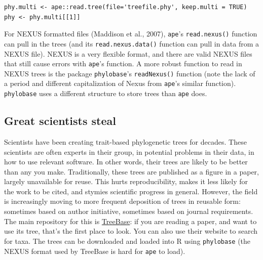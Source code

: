 \documentclass[]{book}
\theoremstyle{definition}
\theoremstyle{definition}
\theoremstyle{remark}
\begin{document}
\begin{verbatim}
phy.multi <- ape::read.tree(file='treefile.phy', keep.multi = TRUE)
phy <- phy.multi[[1]]
\end{verbatim}

For NEXUS formatted files (Maddison et al., 2007), \texttt{ape}'s
\texttt{read.nexus()} function can pull in the trees (and its
\texttt{read.nexus.data()} function can pull in data from a NEXUS file).
NEXUS is a very flexible format, and there are valid NEXUS files that
still cause errors with \texttt{ape}'s function. A more robust function
to read in NEXUS trees is the package \texttt{phylobase}'s
\texttt{readNexus()} function (note the lack of a period and different
capitalization of Nexus from \texttt{ape}'s similar function).
\texttt{phylobase} uses a different structure to store trees than
\texttt{ape} does.

\subsection{Great scientists steal}\label{great-scientists-steal}

Scientists have been creating trait-based phylogenetic trees for
decades. These scientists are often experts in their group, in potential
problems in their data, in how to use relevant software. In other words,
their trees are likely to be better than any you make. Traditionally,
these trees are published as a figure in a paper, largely unavailable
for reuse. This hurts reproducibility, makes it less likely for the work
to be cited, and stymies scientific progress in general. However, the
field is increasingly moving to more frequent deposition of trees in
reusable form: sometimes based on author initiative, sometimes based on
journal requirements. The main repository for this is
\href{http://treebase.org}{TreeBase}: if you are reading a paper, and
want to use its tree, that's the first place to look. You can also use
their website to search for taxa. The trees can be downloaded and loaded
into R using \texttt{phylobase} (the NEXUS format used by TreeBase is
hard for \texttt{ape} to load).
\end{document}
